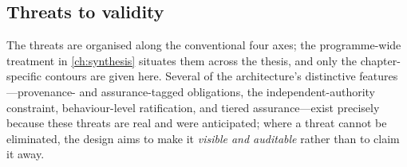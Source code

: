 \subsection{Threats to validity}\label{subsec:a5-threats}

The threats are organised along the conventional four axes; the programme-wide treatment in \cref{ch:synthesis} situates them across the thesis, and only the chapter-specific contours are given here. Several of the architecture's distinctive features---provenance- and assurance-tagged obligations, the independent-authority constraint, behaviour-level ratification, and tiered assurance---exist precisely because these threats are real and were anticipated; where a threat cannot be eliminated, the design aims to make it \emph{visible and auditable} rather than to claim it away.

